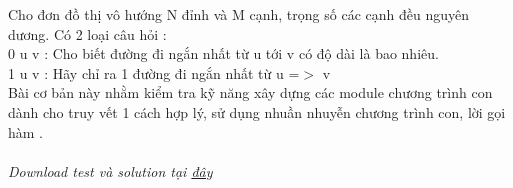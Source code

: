 Cho đơn đồ thị vô hướng N đỉnh và M cạnh, trọng số các cạnh đều nguyên dương. Có 2 loại câu hỏi :   
\\   0 u v : Cho biết đường đi ngắn nhất từ u tới v có độ dài là bao nhiêu.   
\\   1 u v : Hãy chỉ ra 1 đường đi ngắn nhất từ u =$>$ v   
\\   Bài cơ bản này nhằm kiểm tra kỹ năng xây dựng các module chương trình con dành cho truy vết 1 cách hợp lý, sử dụng nhuần nhuyễn chương trình con, lời gọi hàm .   
\\
\\\textit{    Download test và solution tại    \href{http://vn.spoj.pl/content/floyd.rar}{     đây    }}

\